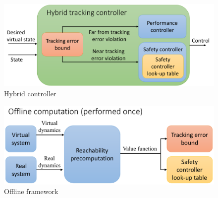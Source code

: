 \begin{figure}[h!]
  \includegraphics[width=\columnwidth]{fig/hybrid_controller}
  \caption{Hybrid controller}
  \label{fig:hybrid_ctrl}
\end{figure}

\begin{figure}[h!]
  \includegraphics[width=\columnwidth]{fig/framework_offline}
  \caption{Offline framework}
  \label{fig:fw_offline}
\end{figure}